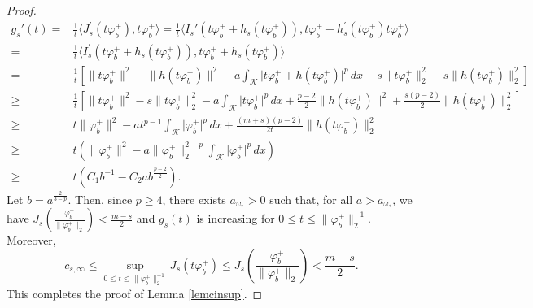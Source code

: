 \documentclass[11pt]{amsart}
\newcommand{\abs}[1]{\lvert#1\rvert}
\newcommand{\norm}[1]{\lVert#1\rVert}
\newcommand{\K}{\mathcal{K}}
\numberwithin{equation}{section}
\begin{document}
\begin{proof}
$$
\begin{aligned}
g_s'(t)  =&\frac{1}{t}\langle J_s^{\prime}(t\varphi_b^+), t\varphi_b^+\rangle=\frac{1}{t}\langle I_s'(t\varphi_b^++h_s(t\varphi_b^+)), t \varphi_b^++h_s^\prime(t\varphi_b^+) t\varphi_b^+\rangle \\
 =&\frac{1}{t}\langle I_s^{\prime}(t\varphi_b^++h_s(t\varphi_b^+)), t\varphi_b^+ + h_s(t\varphi_b^+)\rangle \\
 =&\frac{1}{t}\left[\norm{t\varphi_b^+}^2-\norm{h(t\varphi_b^+)}^2-a\int_{\K} \abs{t\varphi_b^+ + h(t\varphi_b^+)}^p \,dx-s\norm{t\varphi_b^+}^2_2-s\norm{h(t\varphi_b^+)}^2_2\right]\\
 \geq& \frac{1}{t}\left[\norm{t\varphi_b^+}^{2} - s\norm{t\varphi_b^+}^2_2-a\int_{\K}\abs{t\varphi_b^+}^{p}\,dx+ \frac{p-2}{2}\norm{h(t\varphi_b^+)}^{2} + \frac{s(p-2)}{2}\norm{h(t\varphi_b^+)}^{2}_2\right] \\
 \geq& t\norm{\varphi_b^+}^2-at^{p-1}\int_{\K} \abs{\varphi_b^+}^{p} \,dx + \frac{(m+s)(p-2)}{2t}\norm{h(t\varphi_b^+)}^{2}_2\\
 \geq& t\left(\norm{\varphi_b^+}^2-a\norm{\varphi_b^+}_{2}^{2-p}\int_{\K} \abs{\varphi_b^+}^{p} \,dx\right)\\
 \geq& t(C_1b^{-1} - C_2ab^\frac{p-2}{2}).
\end{aligned}
$$
Let $b = a^\frac{2}{3-p}$. Then, since $p \geq 4$, there exists $a_{\omega_*} >0$ such that, for all $a > a_{\omega_*}$, we have $J_s(\frac{\varphi_b^+}{\norm{\varphi_b^+}_2}) < \frac{m-s}{2}$ and $g_s(t)$ is increasing for $0 \leq t \leq\norm{\varphi_b^+}_{2} ^{-1}$. Moreover,
$$
c_{s,\infty} \leq \sup _{0 \leq t \leq\norm{\varphi_b^+}_{2} ^{-1}} J_s(t\varphi_b^+) \leq J_s(\frac{\varphi_b^+}{\norm{\varphi_b^+}_2}) < \frac{m-s}{2}.
$$
This completes the proof of Lemma \ref{lemcinsup}.
\end{proof}
\end{document}

